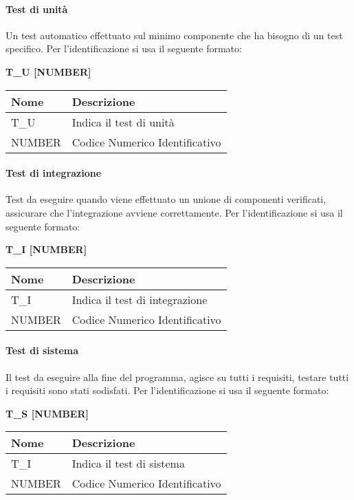\paragraph{Test di unità} \hfill \break
Un test automatico effettuato sul minimo componente che ha bisogno di un test specifico.\newline
Per l’identificazione si usa il seguente formato:
\begin{center}
    \textbf{T\_U [NUMBER]}
\end{center}
\renewcommand{\arraystretch}{1.8} 
 \begin{tabular}{ |m{7em}|m{30em}| }
        \hline 
        \textbf{Nome} & \textbf{Descrizione} \\
        \hline
            T\_U & Indica il test di unità \\
        \hline
            NUMBER & Codice Numerico Identificativo \\
        \hline
 \end{tabular}

\paragraph{Test di integrazione}  \hfill \break
Test da eseguire quando viene effettuato un unione di componenti verificati, assicurare che l’integrazione avviene correttamente.
Per l’identificazione si usa il seguente formato:
\begin{center}
    \textbf{T\_I [NUMBER]}
\end{center}
\renewcommand{\arraystretch}{1.8} 
 \begin{tabular}{ |m{7em}|m{30em}| }
        \hline
        \textbf{Nome} & \textbf{Descrizione} \\
        \hline
            T\_I & Indica il test di integrazione \\
        \hline
            NUMBER & Codice Numerico Identificativo \\
        \hline
 \end{tabular}

\paragraph{Test di sistema}  \hfill \break
Il test da eseguire alla fine del programma, agisce su tutti i requisiti, testare tutti i requisiti sono stati sodisfati.
Per l’identificazione si usa il seguente formato:
\begin{center}
    \textbf{T\_S [NUMBER]}
\end{center}
\renewcommand{\arraystretch}{1.8} 
 \begin{tabular}{ |m{7em}|m{30em}| }
        \hline
        \textbf{Nome} & \textbf{Descrizione} \\
        \hline
            T\_I & Indica il test di sistema \\
        \hline
            NUMBER & Codice Numerico Identificativo \\
        \hline
 \end{tabular}

